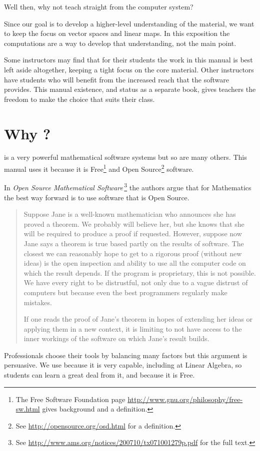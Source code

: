 Well then, why 
not teach straight from the computer system?

Since our goal is to 
develop a higher-level understanding of the material, we want to  
keep the focus on vector spaces and linear maps.
In this exposition 
the computations are a way to develop that understanding, not the main point.

Some instructors may find 
that for their students
the work in this manual is best left aside altogether, 
keeping a tight focus on the
core material.
Other instructors
have students who will benefit from the increased reach that the software
provides.
This manual existence, and status as a separate book, 
gives teachers the freedom
to make the choice that suits their class.


\section{Why \Sage?}
\Sage{} is a very powerful mathematical software systems but so are
many others.
This manual uses it because it is 
Free\footnote{The Free Software Foundation page 
\protect\url{http://www.gnu.org/philosophy/free-sw.html} 
gives background and a definition.} 
and Open Source\footnote{See \protect\url{http://opensource.org/osd.html} 
for a definition.} 
software.

In 
\textit{Open Source Mathematical Software\,}\citep{JoynerStein07}\footnote{See 
\protect\url{http://www.ams.org/notices/200710/tx071001279p.pdf} for the 
full text.}
the authors argue that for Mathematics the best way forward
is to use software that is Open Source.

\begin{quotation}\small
Suppose Jane is a well-known mathematician who announces
she has proved a theorem. We probably will believe
her, but she knows that she will be required to produce
a proof if requested. However, suppose now Jane says a
theorem is true based partly on the results of software. The
closest we can reasonably hope to get to a rigorous proof
(without new ideas) is the open inspection and ability to use
all the computer code on which the result depends. If the
program is proprietary, this is not possible. We have every
right to be distrustful, not only due to a vague distrust of
computers but because even the best programmers regularly
make mistakes.

If one reads the proof of Jane’s theorem in hopes of
extending her ideas or applying them in a new context, it
is limiting to not have access to the inner workings of the
software on which Jane’s result builds.
\end{quotation}  
Professionals choose their tools by balancing many factors but
this argument is persuasive.
We use \Sage{} because it is very capable, 
including at Linear Algebra, so students can 
learn a great deal from it,
and because it is Free.


